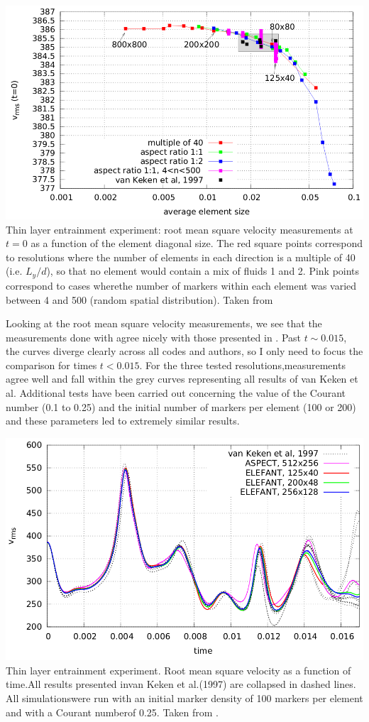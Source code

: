 \begin{center}
\includegraphics[width=0.65\linewidth]{images/benchmark_thinlayer/thie14}\\
{\scriptsize 
Thin layer entrainment experiment: root mean square velocity measurements at
$t=0$ as a function of the element diagonal size. 
The red square points correspond to resolutions where the number of elements in each direction 
is a multiple of 40 (i.e. $L_y/d$), so that no element would contain a mix of fluids 1 and 2. 
Pink points correspond to cases wherethe number of markers within each element was varied between 4 and 500 
(random spatial distribution). Taken from \cite{thie14}}
\end{center}


Looking at the root mean square velocity measurements, we see that
the measurements done with \elefant agree nicely with those presented in \cite{vaks97}. 
Past $t\sim0.015$, the curves diverge clearly across all codes and authors, 
so I only need to focus the comparison for times $t <0.015$. 
For the three tested resolutions,measurements agree well and fall within the grey curves 
representing all results of van Keken et al. 
Additional tests have been carried out concerning the value of the
Courant number (0.1 to 0.25) and the initial number of markers per element (100 or 200) 
and these parameters led to extremely similar results.

\begin{center}
\includegraphics[width=0.65\linewidth]{images/benchmark_thinlayer/thie14b}\\
{\scriptsize Thin layer entrainment experiment. Root mean square velocity as a function of time.All results presented invan Keken et al.(1997) are collapsed in dashed lines. All simulationswere run with an initial marker density of 100 markers per element and with a Courant numberof 0.25. Taken from \cite{thie14}.}
\end{center}

